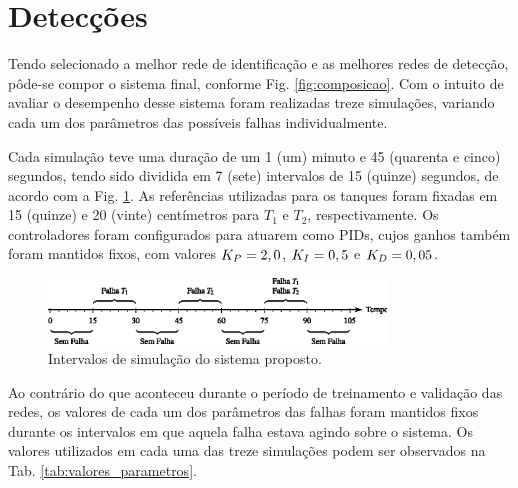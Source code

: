 \section{Detecções}
Tendo selecionado a melhor rede de identificação e as melhores redes de
detecção, pôde-se compor o sistema final, conforme Fig. \ref{fig:composicao}.
Com o intuito de avaliar o desempenho desse sistema foram realizadas treze
simulações, variando cada um dos parâmetros das possíveis falhas
individualmente.

Cada simulação teve uma duração de um 1 (um) minuto e 45 (quarenta e cinco)
segundos, tendo sido dividida em 7 (sete) intervalos de 15 (quinze) segundos, de
acordo com a Fig. \ref{fig:intervalos}. As referências utilizadas para os
tanques foram fixadas em 15 (quinze) e 20 (vinte) centímetros para $T_1$ e
$T_2$, respectivamente. Os controladores foram configurados para atuarem como
PIDs, cujos ganhos também foram mantidos fixos, com valores $K_{\tiny P} = 2,0$,
$K_{\tiny I} = 0,5$ e $K_{\tiny D} = 0,05$.

\begin{figure}[htb]
\centering
    \includegraphics[width=0.8\textwidth]{imgs/resultados/eps/intervalos}
    \caption{Intervalos de simulação do sistema proposto.}
    \label{fig:intervalos}
\end{figure}

Ao contrário do que aconteceu durante o período de treinamento e validação das
redes, os valores de cada um dos parâmetros das falhas foram mantidos fixos
durante os intervalos em que aquela falha estava agindo sobre o sistema. Os
valores utilizados em cada uma das treze simulações podem ser observados na Tab.
\ref{tab:valores_parametros}.

